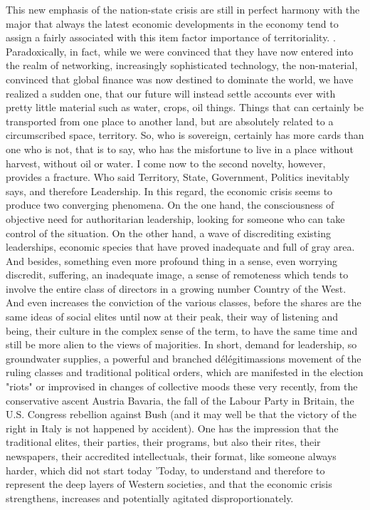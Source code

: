 This new emphasis of the nation-state crisis are still in perfect harmony with the major that always the latest economic developments in the economy tend to assign a fairly associated with this item factor importance of territoriality.
. Paradoxically, in fact, while we were convinced that they have now entered into the realm of networking, increasingly sophisticated technology, the non-material, convinced that global finance was now destined to dominate the world, we have realized a sudden one, that our future will instead settle accounts ever with pretty little material such as water, crops, oil things.
Things that can certainly be transported from one place to another land, but are absolutely related to a circumscribed space, territory.
So, who is sovereign, certainly has more cards than one who is not, that is to say, who has the misfortune to live in a place without harvest, without oil or water.
I come now to the second novelty, however, provides a fracture.
Who said Territory, State, Government, Politics inevitably says, and therefore Leadership.
In this regard, the economic crisis seems to produce two converging phenomena.
On the one hand, the consciousness of objective need for authoritarian leadership, looking for someone who can take control of the situation.
On the other hand, a wave of discrediting existing leaderships, economic species that have proved inadequate and full of gray area.
And besides, something even more profound thing in a sense, even worrying discredit, suffering, an inadequate image, a sense of remoteness which tends to involve the entire class of directors in a growing number Country of the West.
And even increases the conviction of the various classes, before the shares are the same ideas of social elites until now at their peak, their way of listening and being, their culture in the complex sense of the term, to have the same time and still be more alien to the views of majorities.
In short, demand for leadership, so groundwater supplies, a powerful and branched délégitimassions movement of the ruling classes and traditional political orders, which are manifested in the election "riots" or improvised in changes of collective moods these very recently, from the conservative ascent Austria Bavaria, the fall of the Labour Party in Britain, the U.S. Congress rebellion against Bush (and it may well be that the victory of the right in Italy is not happened by accident).
One has the impression that the traditional elites, their parties, their programs, but also their rites, their newspapers, their accredited intellectuals, their format, like someone always harder, which did not start today 'Today, to understand and therefore to represent the deep layers of Western societies, and that the economic crisis strengthens, increases and potentially agitated disproportionately.
